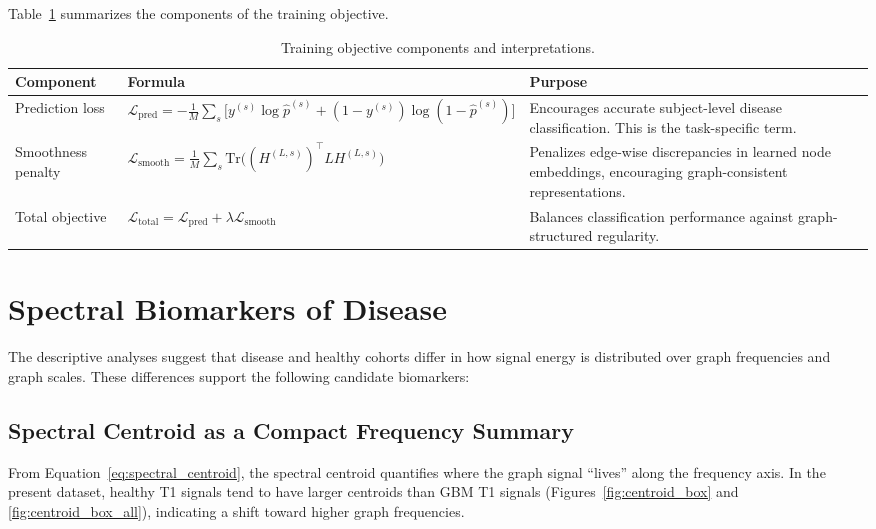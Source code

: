 Table~\ref{tab:training_objective_summary} summarizes the components of the training objective.

\begin{table}[H]
    \centering
    \caption{Training objective components and interpretations.}
    \label{tab:training_objective_summary} %
    \begin{tabular}{p{3.6cm} p{5.2cm} p{6.2cm}}
        \toprule
        \textbf{Component} & \textbf{Formula} & \textbf{Purpose} \\
        \midrule
        Prediction loss &
        \(\mathcal{L}_{\mathrm{pred}}
        =-\frac{1}{M}\sum_s \big[y^{(s)}\log \hat p^{(s)}+(1-y^{(s)})\log(1-\hat p^{(s)})\big]\) &
        Encourages accurate subject-level disease classification. This is the task-specific term. \\
        \addlinespace
        Smoothness penalty &
        \(\mathcal{L}_{\mathrm{smooth}}
        =\frac{1}{M}\sum_s \mathrm{Tr}\big((H^{(L,s)})^\top L H^{(L,s)}\big)\) & %
        Penalizes edge-wise discrepancies in learned node embeddings, encouraging graph-consistent representations. \\
        \addlinespace
        Total objective &
        \(\mathcal{L}_{\mathrm{total}}
        = \mathcal{L}_{\mathrm{pred}}+\lambda \mathcal{L}_{\mathrm{smooth}}\) &
        Balances classification performance against graph-structured regularity. \\
        \bottomrule
    \end{tabular}
\end{table}

\section{Spectral Biomarkers of Disease}
\label{sec:ch4_biomarkers} %

The descriptive analyses suggest that disease and healthy cohorts differ in how signal energy is distributed over graph frequencies and graph scales. These differences support the following candidate biomarkers:

\subsection{Spectral Centroid as a Compact Frequency Summary}

From Equation~\eqref{eq:spectral_centroid}, the spectral centroid quantifies where the graph signal ``lives'' along the frequency axis. In the present dataset, healthy T1 signals tend to have larger centroids than GBM T1 signals (Figures~\ref{fig:centroid_box} and \ref{fig:centroid_box_all}), indicating a shift toward higher graph frequencies. %

